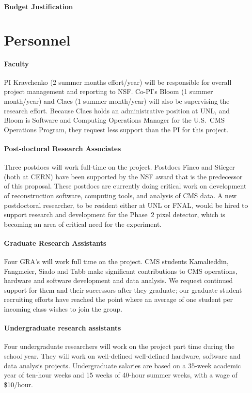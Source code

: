 \documentclass[11pt]{article}
\begin{document}
\begin{center}
{\Large \bf Budget Justification}\\
\end{center}

\section{Personnel} 

\paragraph{Faculty} PI Kravchenko (2 summer months effort/year) will be
responsible for overall project management and reporting to NSF.  Co-PI's
Bloom (1 summer month/year) and Claes (1 summer month/year) will also be supervising the research effort.  Because Claes
holds an administrative position at UNL, and Bloom is Software and
Computing Operations Manager for the U.S.~CMS Operations Program, they
request less support than the PI for this project.

\paragraph{Post-doctoral Research Associates} Three postdocs will work
full-time on the project.  Postdocs Finco and Stieger (both at CERN) have
been supported by the NSF award that is the predecessor of this proposal.
These postdocs are currently doing critical work on development of
reconstruction software, computing tools, and analysis of CMS data.  A new
postdoctoral researcher, to be resident either at UNL or FNAL, would be
hired to support research and development for the Phase~2 pixel detector,
which is becoming an area of critical need for the experiment.

\paragraph{Graduate Research Assistants} Four GRA's will work full time on
the project.  CMS students Kamalieddin, Fangmeier, Siado and Tabb make
significant contributions to CMS operations, hardware and software
development and data analysis.  We request continued support for them and
their successors after they graduate; our graduate-student recruiting
efforts have reached the point where an average of one student per incoming
class wishes to join the group.

\paragraph{Undergraduate research assistants} Four undergraduate
researchers will work on the project part time during the school year.  They
will work on well-defined well-defined hardware, software and data analysis
projects.  Undergraduate salaries are based on a 35-week academic year of ten-hour weeks and 15 weeks of 40-hour summer weeks, with a wage of \$10/hour.
\end{document}
